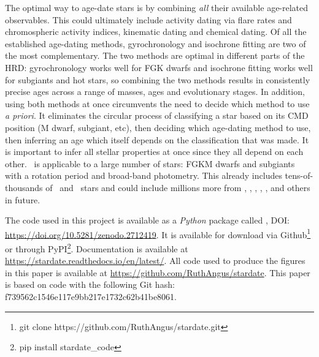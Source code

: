 The optimal way to age-date stars is by combining {\it all} their available
age-related observables.
This could ultimately include activity dating via flare rates and
chromospheric activity indices, kinematic dating and chemical dating.
Of all the established age-dating methods, gyrochronology and isochrone
fitting are two of the most complementary.
The two methods are optimal in different parts of the HRD:
gyrochronology works well for FGK dwarfs and isochrone fitting works well for
subgiants and hot stars, so combining the two methods results in consistently
precise ages across a range of masses, ages and evolutionary stages.
In addition, using both methods at once circumvents the need to decide which
method to use {\it a priori}.
It eliminates the circular process of classifying a star based on its CMD
position (M dwarf, subgiant, etc), then deciding which age-dating method to
use, then inferring an age which itself depends on the classification that was
made.
It is important to infer all stellar properties at once since they all depend
on each other.
\sd\ is applicable to a large number of stars: FGKM dwarfs and subgiants with
a rotation period and broad-band photometry.
This already includes tens-of-thousands of \kepler\ and \ktwo\ stars and could
include millions more from \tess, \lsst, \wfirst, \plato, \gaia, and others in
future.

The code used in this project is available as a {\it Python} package called
\sd, DOI: \url{ https://doi.org/10.5281/zenodo.2712419}.
It is available for download via Github\footnote{git clone
https://github.com/RuthAngus/stardate.git} or through
PyPI\footnote{pip install stardate\_code}.
Documentation is available at \url{https://stardate.readthedocs.io/en/latest/}.
All code used to produce the figures in this paper is available at
\url{https://github.com/RuthAngus/stardate}.
This paper is based on code with the following Git hash:
f739562c1546e117e9bb217e1732c62b41be8061.
